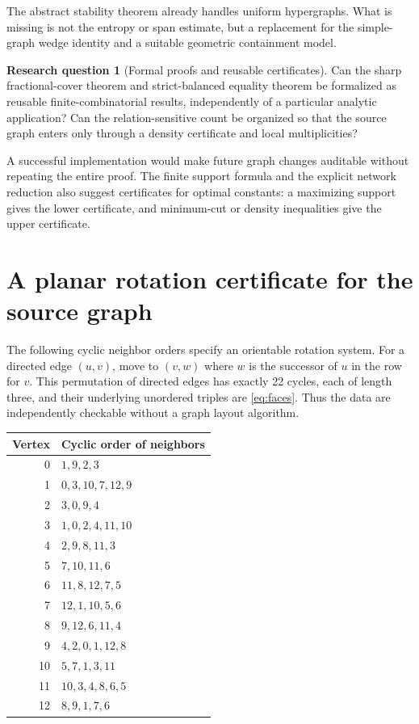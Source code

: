 \documentclass[11pt]{article}
\theoremstyle{definition}
\newtheorem{question}[theorem]{Research question}
\theoremstyle{remark}
\newcommand{\1}{\mathbf 1}
\begin{document}
The abstract stability theorem already handles uniform hypergraphs. What is
missing is not the entropy or span estimate, but a replacement for the
simple-graph wedge identity and a suitable geometric containment model.

\begin{question}[Formal proofs and reusable certificates]
Can the sharp fractional-cover theorem and strict-balanced equality theorem be
formalized as reusable finite-combinatorial results, independently of a
particular analytic application? Can the relation-sensitive count be organized
so that the source graph enters only through a density certificate and local
multiplicities?
\end{question}

A successful implementation would make future graph changes auditable without
repeating the entire proof. The finite support formula and the explicit
network reduction also suggest certificates for optimal constants: a maximizing
support gives the lower certificate, and minimum-cut or density inequalities
give the upper certificate.

\appendix
\section{A planar rotation certificate for the source graph}
\label{app:rotation}

The following cyclic neighbor orders specify an orientable rotation system.
For a directed edge $(u,v)$, move to $(v,w)$ where $w$ is the successor of $u$
in the row for $v$. This permutation of directed edges has exactly 22 cycles,
each of length three, and their underlying unordered triples are
\eqref{eq:faces}. Thus the data are independently checkable without a graph
layout algorithm.

\begin{center}
\begin{tabular}{@{}rl@{}}
\toprule
Vertex & Cyclic order of neighbors\\
\midrule
0 & $1,9,2,3$\\
1 & $0,3,10,7,12,9$\\
2 & $3,0,9,4$\\
3 & $1,0,2,4,11,10$\\
4 & $2,9,8,11,3$\\
5 & $7,10,11,6$\\
6 & $11,8,12,7,5$\\
7 & $12,1,10,5,6$\\
8 & $9,12,6,11,4$\\
9 & $4,2,0,1,12,8$\\
10 & $5,7,1,3,11$\\
11 & $10,3,4,8,6,5$\\
12 & $8,9,1,7,6$\\
\bottomrule
\end{tabular}
\end{center}
\end{document}

